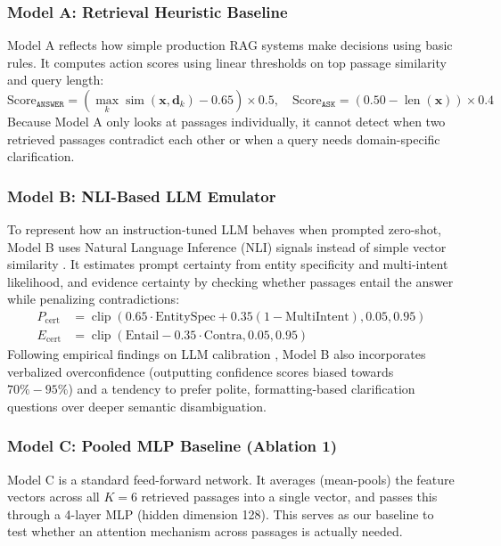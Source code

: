 \subsubsection{Model A: Retrieval Heuristic Baseline}
Model A reflects how simple production RAG systems make decisions using basic rules. It computes action scores using linear thresholds on top passage similarity and query length:
\begin{equation}
    \text{Score}_{\texttt{ANSWER}} = (\max_k \operatorname{sim}(\bm{x}, \bm{d}_k) - 0.65) \times 0.5, \quad \text{Score}_{\texttt{ASK}} = (0.50 - \operatorname{len}(\bm{x})) \times 0.4 \tag{A}
\end{equation}
Because Model A only looks at passages individually, it cannot detect when two retrieved passages contradict each other or when a query needs domain-specific clarification.

\subsubsection{Model B: NLI-Based LLM Emulator}
To represent how an instruction-tuned LLM behaves when prompted zero-shot, Model B uses Natural Language Inference (NLI) signals instead of simple vector similarity \cite{kuhn2023semantic, manakul2023selfcheckgpt, honovich2022true}. It estimates prompt certainty from entity specificity and multi-intent likelihood, and evidence certainty by checking whether passages entail the answer while penalizing contradictions:
\begin{align*}
    P_{\text{cert}} &= \operatorname{clip}(0.65 \cdot \text{EntitySpec} + 0.35(1 - \text{MultiIntent}), 0.05, 0.95) \\
    E_{\text{cert}} &= \operatorname{clip}(\text{Entail} - 0.35 \cdot \text{Contra}, 0.05, 0.95) \tag{B}
\end{align*}
Following empirical findings on LLM calibration \cite{xiong2024can}, Model B also incorporates verbalized overconfidence (outputting confidence scores biased towards $70\% - 95\%$) and a tendency to prefer polite, formatting-based clarification questions over deeper semantic disambiguation.

\subsubsection{Model C: Pooled MLP Baseline (Ablation 1)}
Model C is a standard feed-forward network. It averages (mean-pools) the feature vectors across all $K=6$ retrieved passages into a single vector, and passes this through a 4-layer MLP (hidden dimension 128). This serves as our baseline to test whether an attention mechanism across passages is actually needed.

